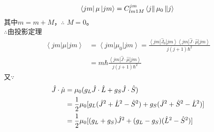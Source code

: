 \documentclass[12pt]{article}
\numberwithin{equation}{section}	 %
\begin{document}
\begin{spacing}{1.5}
\begin{equation}
\left<jm\right| \mu \left|jm\right> = C^{jm}_{lm1M}\left< j \right\| \mu_{0} \left\| j \right> \\
\end{equation}
其中$m=m+M$，$\therefore$ $M=0$。\\
$\therefore$由投影定理
\begin{equation}
\begin{aligned}
\left<jm\right| \mu \left|jm\right> &= \left< jm \right| \mu_{0} \left| jm \right> = \frac{\left< jm \right| \hat{J}_{0} \left| jm \right> \left< jm \right| \hat{J}\cdot\hat{\mu} \left| jm \right>}{j(j+1)\hbar^{2}}\\
&= m\hbar\frac{\left< jm \right| \hat{J}\cdot\hat{\mu} \left| jm \right>}{j(j+1)\hbar^{2}}
\end{aligned}
\end{equation}
又$\because$
\begin{align}\nonumber 		%
\hat{J}\cdot\hat{\mu} &= \mu_{0}(g_{L}\hat{J}\cdot\hat{L}+g_{S}\hat{J}\cdot\hat{S}) \notag \\
&= \frac{1}{2}\mu_{0} [ g_{L}(\hat{J}^{2}+\hat{L}^{2}-\hat{S}^{2})+g_{S}(\hat{J}^{2}+\hat{S}^{2}-\hat{L}^{2}) ] \notag \\
&= \frac{1}{2}\mu_{0} [ (g_{L}+g_{S})\hat{J}^{2}+(g_{L}-g_{S})(\hat{L}^{2}-\hat{S}^{2}) ] \notag \\
\end{align}


\end{spacing}
\end{document}
